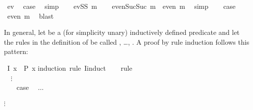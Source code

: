 \begin{isabellebody}
\ ev{}\ \isamarkupfalse%
\ {}case\ \isamarkupfalse%
\ simp\isanewline
{}\isamarkupfalse%
\isanewline
\ \ \isamarkupfalse%
\ {}evSS\ m{}\isanewline
\ \ \isamarkupfalse%
\ {}even{}Suc{}Suc\ m{}{}\ {}\ even\ m{}\ \isamarkupfalse%
\ simp\isanewline
\ \ \isamarkupfalse%
\ {}case\ \isamarkupfalse%
\ {}even\ m{}\ \isamarkupfalse%
\ blast\isanewline
{}\isamarkupfalse%
%
\endisatagproof
{\isafoldproof}%
%
\isadelimproof
%
\endisadelimproof
%
\begin{isamarkuptext}%
\indent
In general, let  be a (for simplicity unary) inductively defined
predicate and let the rules in the definition of 
be called , \dots, . A proof by rule
induction follows this pattern:%
\end{isamarkuptext}%
\isamarkuptrue%
%
\isadelimproof
%
\endisadelimproof
%
\isatagproof
{}\isamarkupfalse%
\ {}I\ x\ {}\ P\ x{}\isanewline
{}\isamarkupfalse%
{}induction\ rule{}\ I{}induct{}\isanewline
\ \ \isamarkupfalse%
\ rule%
\\[-.4ex]\mbox{}\ \ $\vdots$\\[-.4ex]\mbox{}\hspace{-1ex}
\ \ \isamarkupfalse%
\ {}case\ %
\ $\dots$\\
\isamarkupfalse%
%
\\[-.4ex]$\vdots$\\[-.4ex]\mbox{}\hspace{-1ex}

\end{isabellebody}
